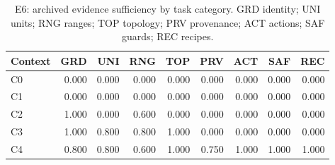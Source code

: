 \begin{table}[t]
\centering\footnotesize
\caption{E6: archived evidence sufficiency by task category. GRD identity; UNI units; RNG ranges; TOP topology; PRV provenance; ACT actions; SAF guards; REC recipes.}
\label{tab:archive-categories}
\setlength{\tabcolsep}{3.5pt}
\begin{tabular}{@{}lrrrrrrrr@{}}
\toprule
Context & GRD & UNI & RNG & TOP & PRV & ACT & SAF & REC \\
\midrule
C0 & 0.000 & 0.000 & 0.000 & 0.000 & 0.000 & 0.000 & 0.000 & 0.000 \\
C1 & 0.000 & 0.000 & 0.000 & 0.000 & 0.000 & 0.000 & 0.000 & 0.000 \\
C2 & 1.000 & 0.000 & 0.600 & 0.000 & 0.000 & 0.000 & 0.000 & 0.000 \\
C3 & 1.000 & 0.800 & 0.800 & 1.000 & 0.000 & 0.000 & 0.000 & 0.000 \\
C4 & 0.800 & 0.800 & 0.600 & 1.000 & 0.750 & 1.000 & 1.000 & 1.000 \\
\bottomrule
\end{tabular}
\end{table}
